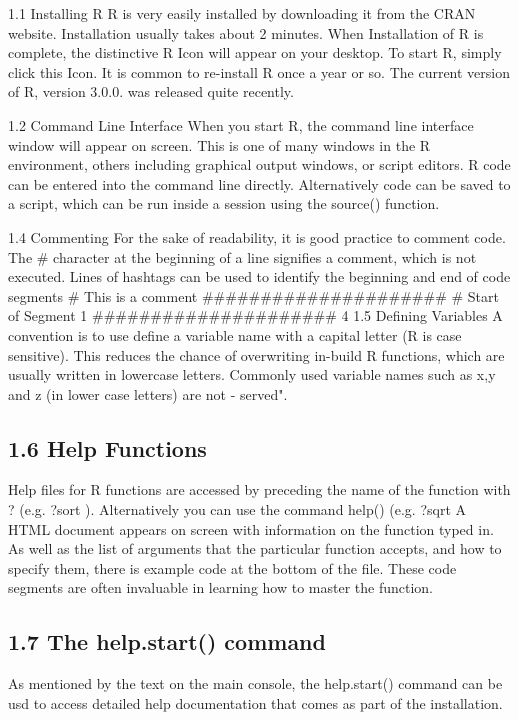 1.1 Installing R
R is very easily installed by downloading it from the CRAN website. Installation usually takes
about 2 minutes. When Installation of R is complete, the distinctive R Icon will appear on your
desktop. To start R, simply click this Icon. It is common to re-install R once a year or so. The
current version of R, version 3.0.0. was released quite recently.

1.2 Command Line Interface
When you start R, the command line interface window will appear on screen. This is one
of many windows in the R environment, others including graphical output windows, or script
editors. R code can be entered into the command line directly. Alternatively code can be saved
to a script, which can be run inside a session using the source() function.


1.4 Commenting
For the sake of readability, it is good practice to comment code. The # character at the
beginning of a line signifies a comment, which is not executed. Lines of hashtags can be used
to identify the beginning and end of code segments
# This is a comment
#####################
# Start of Segment 1
#####################
4
1.5 Defining Variables
A convention is to use define a variable name with a capital letter (R is case sensitive). This
reduces the chance of overwriting in-build R functions, which are usually written in lowercase
letters. Commonly used variable names such as x,y and z (in lower case letters) are not \re-
served".
\subsection{1.6 Help Functions}
Help files for R functions are accessed by preceding the name of the function with ? (e.g. ?sort
). Alternatively you can use the command help() (e.g. ?sqrt
A HTML document appears on screen with information on the function typed in. As well
as the list of arguments that the particular function accepts, and how to specify them, there is
example code at the bottom of the file. These code segments are often invaluable in learning
how to master the function.

\subsection{1.7 The help.start() command}
As mentioned by the text on the main console, the help.start() command can be usd to
access detailed help documentation that comes as part of the installation.

